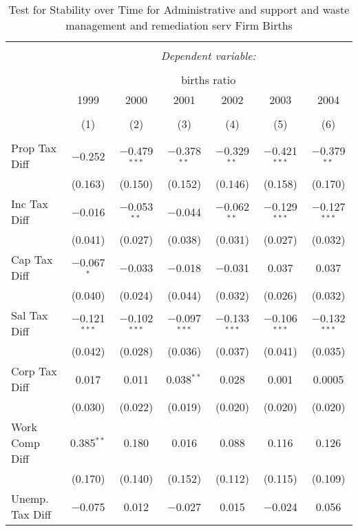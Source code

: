 
\begin{table}[!htbp] \centering 
  \caption{Test for Stability over Time for  Administrative and support and waste management and remediation serv Firm Births} 
  \label{56year} 
\small 
\begin{tabular}{@{\extracolsep{5pt}}lcccccc} 
\\[-1.8ex]\hline 
\hline \\[-1.8ex] 
 & \multicolumn{6}{c}{\textit{Dependent variable:}} \\ 
\cline{2-7} 
\\[-1.8ex] & \multicolumn{6}{c}{births ratio} \\ 
 & 1999 & 2000 & 2001 & 2002 & 2003 & 2004 \\ 
\\[-1.8ex] & (1) & (2) & (3) & (4) & (5) & (6)\\ 
\hline \\[-1.8ex] 
 Prop Tax Diff & $-$0.252 & $-$0.479$^{***}$ & $-$0.378$^{**}$ & $-$0.329$^{**}$ & $-$0.421$^{***}$ & $-$0.379$^{**}$ \\ 
  & (0.163) & (0.150) & (0.152) & (0.146) & (0.158) & (0.170) \\ 
  Inc Tax Diff & $-$0.016 & $-$0.053$^{**}$ & $-$0.044 & $-$0.062$^{**}$ & $-$0.129$^{***}$ & $-$0.127$^{***}$ \\ 
  & (0.041) & (0.027) & (0.038) & (0.031) & (0.027) & (0.032) \\ 
  Cap Tax Diff & $-$0.067$^{*}$ & $-$0.033 & $-$0.018 & $-$0.031 & 0.037 & 0.037 \\ 
  & (0.040) & (0.024) & (0.044) & (0.032) & (0.026) & (0.032) \\ 
  Sal Tax Diff & $-$0.121$^{***}$ & $-$0.102$^{***}$ & $-$0.097$^{***}$ & $-$0.133$^{***}$ & $-$0.106$^{***}$ & $-$0.132$^{***}$ \\ 
  & (0.042) & (0.028) & (0.036) & (0.037) & (0.041) & (0.035) \\ 
  Corp Tax Diff & 0.017 & 0.011 & 0.038$^{**}$ & 0.028 & 0.001 & 0.0005 \\ 
  & (0.030) & (0.022) & (0.019) & (0.020) & (0.020) & (0.020) \\ 
  Work Comp Diff & 0.385$^{**}$ & 0.180 & 0.016 & 0.088 & 0.116 & 0.126 \\ 
  & (0.170) & (0.140) & (0.152) & (0.112) & (0.115) & (0.109) \\ 
  Unemp. Tax Diff & $-$0.075 & 0.012 & $-$0.027 & 0.015 & $-$0.024 & 0.056 \\ 

\end{tabular}
\end{table}
